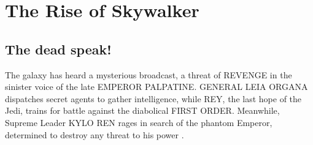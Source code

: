 \chapter{The Rise of Skywalker}
\section{The dead speak!}
The galaxy has heard a mysterious broadcast, a threat of 
REVENGE in the sinister voice of the late EMPEROR PALPATINE. 
GENERAL LEIA ORGANA dispatches secret agents to gather 
intelligence, while REY, the last hope of the Jedi, trains 
for battle against the diabolical FIRST ORDER. Meanwhile, 
Supreme Leader KYLO REN rages in search of the phantom 
Emperor, determined to destroy any threat to his power \cite{bib_rey19, bib_kylo19, bib_leia19, bib_lando19, bib_luke19}.

\lipsum[1-20]
